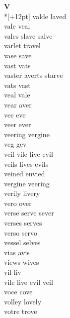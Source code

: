 \vspace{14pt}
\noindent\textbf{\Large V}\\*[+12pt]
valde laved\\
vale veal\\
vales slave salve\\
varlet travel\\
vase save\\
vast vats\\
vaster averts starve\\
vats vast\\
veal vale\\
vear aver\\
vee eve\\
veer ever\\
veering vergine\\
veg gev\\
veil vile live evil\\
veils lives evils\\
veined envied\\
vergine veering\\
verily livery\\
vero over\\
verse serve sever\\
verses serves\\
verso servo\\
vessel selves\\
vias avis\\
views wives\\
vil liv\\
vile live evil veil\\
voce cove\\
volley lovely\\
votre trove\\

